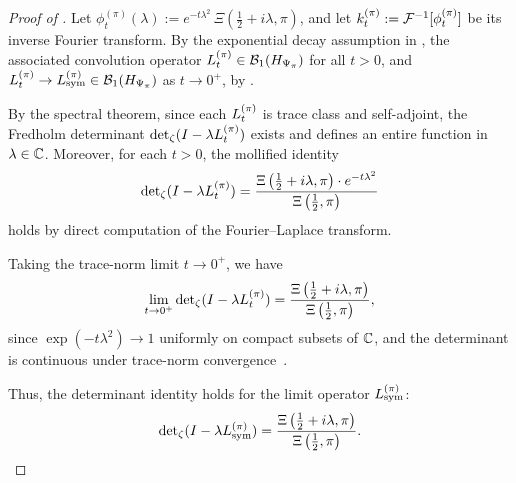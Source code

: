 \begin{proof}[Proof of ]
Let \( \phi_t^{(\pi)}(\lambda) := e^{-t\lambda^2} \, \Xi\left(\tfrac{1}{2} + i\lambda, \pi\right) \), and let \( k_t^{(\pi)} := \mathcal{F}^{-1}[\phi_t^{(\pi)}] \) be its inverse Fourier transform. By the exponential decay assumption in , the associated convolution operator \( L_t^{(\pi)} \in \mathcal{B}_1(H_{\Psi_{\pi}}) \) for all \( t > 0 \), and \( L_t^{(\pi)} \to L_{\mathrm{sym}}^{(\pi)} \in \mathcal{B}_1(H_{\Psi_{\pi}}) \) as \( t \to 0^+ \), by .

By the spectral theorem, since each \( L_t^{(\pi)} \) is trace class and self-adjoint, the Fredholm determinant \( \det\nolimits_{\zeta}(I - \lambda L_t^{(\pi)}) \) exists and defines an entire function in \( \lambda \in \mathbb{C} \). Moreover, for each \( t > 0 \), the mollified identity
\[
\det\nolimits_{\zeta}(I - \lambda L_t^{(\pi)}) = \frac{\Xi\left(\tfrac{1}{2} + i\lambda, \pi\right) \cdot e^{-t\lambda^2}}{\Xi\left(\tfrac{1}{2}, \pi\right)}
\]
holds by direct computation of the Fourier–Laplace transform.

Taking the trace-norm limit \( t \to 0^+ \), we have
\[
\lim_{t \to 0^+} \det\nolimits_{\zeta}(I - \lambda L_t^{(\pi)})
= \frac{\Xi\left(\tfrac{1}{2} + i\lambda, \pi\right)}{\Xi\left(\tfrac{1}{2}, \pi\right)},
\]
since \( \exp(-t\lambda^2) \to 1 \) uniformly on compact subsets of \( \mathbb{C} \), and the determinant is continuous under trace-norm convergence~\cite[Thm.~6.5]{Simon2005TraceIdeals}.

Thus, the determinant identity holds for the limit operator \( L_{\mathrm{sym}}^{(\pi)} \):
\[
\det\nolimits_{\zeta}(I - \lambda L_{\mathrm{sym}}^{(\pi)}) = \frac{\Xi\left(\tfrac{1}{2} + i\lambda, \pi\right)}{\Xi\left(\tfrac{1}{2}, \pi\right)}.
\]
\end{proof}
